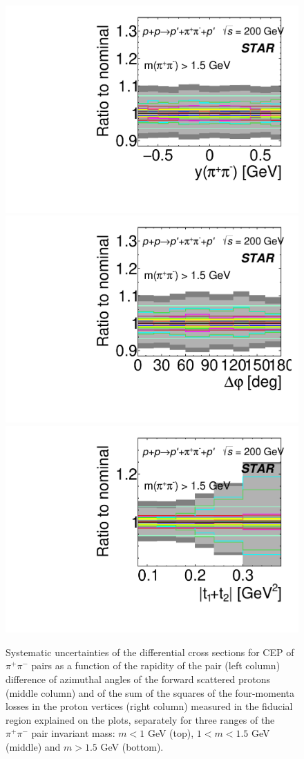 \begin{figure}[h]
\newline
\includegraphics[width=.31\textwidth,page=1]{graphics/systematics/FinalResult_Rapidity_pion_MassBin_3_Systematics2.pdf}
\hfill
\includegraphics[width=.31\textwidth,page=1]{graphics/systematics/FinalResult_DeltaPhi_pion_MassBin_3_Systematics2.pdf}
\hfill
\includegraphics[width=.31\textwidth,page=1]{graphics/systematics/FinalResult_MandelstamTSum_pion_MassBin_3_Systematics2.pdf}
%
\caption{Systematic uncertainties of the differential cross sections for CEP of $\pi^+\pi^-$ pairs as a function of the rapidity of the pair (left column) difference of azimuthal angles of the forward scattered protons (middle column) and of the sum of the squares of the four-momenta losses in the proton vertices (right column) measured in the fiducial region explained on the plots, separately for three ranges of the $\pi^+\pi^-$ pair invariant mass: $m<1$ GeV (top), $1<m<1.5$ GeV (middle) and $m>1.5$ GeV (bottom).}
\label{systematics_4}
\end{figure}
%
%

